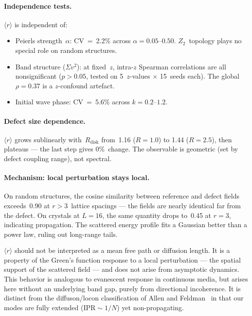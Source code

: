 \documentclass[12pt]{article}
\newcommand{\mr}{\langle r \rangle}
\newcommand{\svtwo}{\Sigma v^2}
\begin{document}
\paragraph{Independence tests.}
$\mr$ is independent of:
\begin{itemize}
  \item Peierls strength~$\alpha$: CV~=~2.2\% across
        $\alpha = 0.05$--$0.50$.  $Z_2$~topology plays no special role on
        random structures.
  \item Band structure ($\svtwo$): at fixed~$z$, intra-$z$ Spearman
        correlations are all nonsignificant ($p > 0.05$, tested on
        5~$z$-values $\times$ 15~seeds each).  The global $\rho = 0.37$ is
        a $z$-confound artefact.
  \item Initial wave phase: CV~=~5.6\% across $k = 0.2$--$1.2$.
\end{itemize}

\paragraph{Defect size dependence.}
$\mr$ grows sublinearly with~$R_{\mathrm{disk}}$ from~1.16 ($R = 1.0$) to
1.44 ($R = 2.5$), then plateaus --- the last step gives 0\%~change.  The
observable is geometric (set by defect coupling range), not spectral.

\paragraph{Mechanism: local perturbation stays local.}
On random structures, the cosine similarity between reference and defect
fields exceeds~0.90 at $r > 3$~lattice spacings --- the fields are nearly
identical far from the defect.  On crystals at $L = 16$, the same quantity
drops to~0.45 at $r = 3$, indicating propagation.  The scattered energy
profile fits a Gaussian better than a power law, ruling out long-range tails.

$\mr$ should not be interpreted as a mean free path or diffusion length.  It
is a property of the Green's function response to a local perturbation --- the
spatial support of the scattered field --- and does not arise from asymptotic
dynamics.  This behavior is analogous to evanescent response in continuous media, but
arises here without an underlying band gap, purely from directional
incoherence.  It is distinct from the diffuson/locon classification of Allen
and Feldman~\cite{allen93,allen99} in that our modes are fully extended
($\mathrm{IPR} \sim 1/N$) yet non-propagating.
\end{document}
